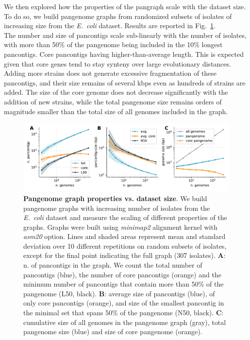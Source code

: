 \documentclass[aps,rmp,preprint,superscriptaddress,10pt,linenumbers]{revtex4-1}
\begin{document}
We then explored how the properties of the pangraph scale with the dataset size. To do so, we build pangenome graphs from randomized subsets of isolates of increasing size from the \textit{E.~coli} dataset. Results are reported in Fig.~\ref{fig:panx-size}.\\
The number and size of pancontigs scale sub-linearly with the number of isolates, with more than 50\% of the pangenome being included in the 10\% longest pancontigs. Core pancontigs having higher-than-average length. This is expected given that core genes tend to stay synteny over large evolutionary distances. Adding more strains does not generate excessive fragmentation of these pancontigs, and their size remains of several kbps even as hundreds of strains are added. The size of the core genome does not decrease significantly with the addition of new strains, while the total pangenome size remains orders of magnitude smaller than the total size of all genomes included in the graph.


\begin{figure}[htb]
    \includegraphics[width=.9\textwidth]{figs/incr_size.pdf}
    \caption{{\bf Pangenome graph properties vs. dataset size}.
        We build pangenome graphs with increasing number of isolates from the \textit{E.~coli} dataset and measure the scaling of different properties of the graphs. Graphs were built using \textit{minimap2} alignment kernel with \textit{asm20} option. Lines and shaded areas represent mean and standard deviation over 10 different repetitions on random subsets of isolates, except for the final point indicating the full graph (307 isolates).
        \textbf{A}: n. of pancontigs in the graph. We count the total number of pancontigs (blue), the number of core pancontigs (orange) and the minimum number of pancontigs that contain more than 50\% of the pangenome (L50, black).
        \textbf{B}: average size of pancontigs (blue), of only core pancontigs (orange), and size of the smallest pancontig in the minimal set that spans 50\% of the pangenome (N50, black).
        \textbf{C}: cumulative size of all genomes in the pangenome graph (gray), total pangenome size (blue) and size of core pangenome (orange).
    }
    \label{fig:panx-size}
\end{figure}
\end{document}
